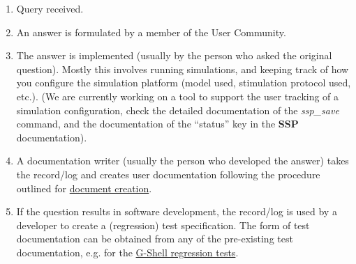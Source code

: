 \documentclass[12pt]{article}
\begin{document}
\begin{enumerate}
\item Query received.
\item An answer is formulated by a member of the User Community.
\item The answer is implemented (usually by the person who asked the
  original question).  Mostly this involves running simulations, and
  keeping track of how you configure the simulation platform (model used, stimulation protocol used, etc.).  (We are currently working
  on a tool to support the user tracking of a simulation
  configuration, check the detailed documentation of the {\it ssp\_save}
  command, and the documentation of the ``status'' key in the {\bf SSP}
  documentation).
\item A documentation writer (usually the person who developed the
  answer) takes the record/log and creates user documentation
  following the procedure outlined for
  \href{../document-create/document-create.tex}{document creation}.
\item If the question results in software development, the record/log
  is used by a developer to create a (regression) test specification.
  The form of test documentation can be obtained from any of the
  pre-existing test documentation, e.g. for the
  \href{../tests-gshell/tests-gshell.tex}{G-Shell regression tests}.
\end{enumerate}
\end{document}

